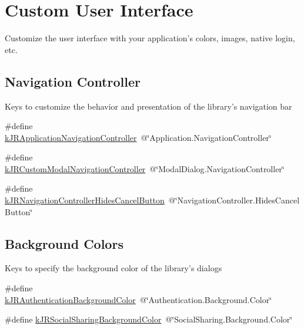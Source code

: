 \hypertarget{group__custom_interface}{
\section{Custom User Interface}
\label{group__custom_interface}
}


Customize the user interface with your application's colors, images, native login, etc.  


\subsection*{Navigation Controller}
\label{_amgrp878b2c7e666df330bdc4f68ee81a024d}
Keys to customize the behavior and presentation of the library's navigation bar

\label{group__custom_interface_customInterfaceKeys}
\hypertarget{group__custom_interface_customInterfaceKeys}{}
 \begin{DoxyCompactItemize}
\item 
\#define \hyperlink{group__custom_interface_ga7bace8001f549fc2ecbe84d967d24d22}{kJRApplicationNavigationController}~@\char`\"{}Application.NavigationController\char`\"{}
\item 
\#define \hyperlink{group__custom_interface_ga679ad3bb2027bd7411ab78498b35d1e5}{kJRCustomModalNavigationController}~@\char`\"{}ModalDialog.NavigationController\char`\"{}
\item 
\#define \hyperlink{group__custom_interface_ga5a178385f76a899dfddc8030238fb5e0}{kJRNavigationControllerHidesCancelButton}~@\char`\"{}NavigationController.HidesCancelButton\char`\"{}
\end{DoxyCompactItemize}
\subsection*{Background Colors}
\label{_amgrpdc55f9575e9d43d9a94ff15dba82dbbc}
 Keys to specify the background color of the library's dialogs \begin{DoxyCompactItemize}
\item 
\#define \hyperlink{group__custom_interface_gacfe014997457d27386eff69eb731ce0f}{kJRAuthenticationBackgroundColor}~@\char`\"{}Authentication.Background.Color\char`\"{}
\item 
\#define \hyperlink{group__custom_interface_ga404751db179428ee64bbe2fda663efa6}{kJRSocialSharingBackgroundColor}~@\char`\"{}SocialSharing.Background.Color\char`\"{}
\end{DoxyCompactItemize}
